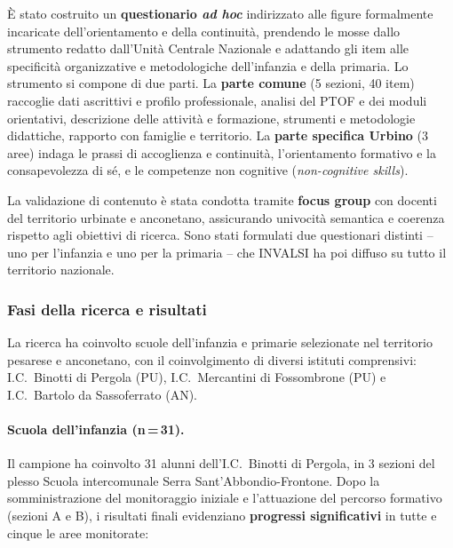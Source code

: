 \documentclass[12pt,a4paper]{article}
\begin{document}
\`E stato costruito un \textbf{questionario \textit{ad hoc}} indirizzato alle figure formalmente incaricate dell'orientamento e della continuit\`a, prendendo le mosse dallo strumento redatto dall'Unit\`a Centrale Nazionale e adattando gli item alle specificit\`a organizzative e metodologiche dell'infanzia e della primaria. Lo strumento si compone di due parti. La \textbf{parte comune} (5 sezioni, 40 item) raccoglie dati ascrittivi e profilo professionale, analisi del PTOF e dei moduli orientativi, descrizione delle attivit\`a e formazione, strumenti e metodologie didattiche, rapporto con famiglie e territorio. La \textbf{parte specifica Urbino} (3 aree) indaga le prassi di accoglienza e continuit\`a, l'orientamento formativo e la consapevolezza di s\'e, e le competenze non cognitive (\textit{non-cognitive skills}).

La validazione di contenuto \`e stata condotta tramite \textbf{focus group} con docenti del territorio urbinate e anconetano, assicurando univocit\`a semantica e coerenza rispetto agli obiettivi di ricerca. Sono stati formulati due questionari distinti -- uno per l'infanzia e uno per la primaria -- che INVALSI ha poi diffuso su tutto il territorio nazionale.

\subsubsection{Fasi della ricerca e risultati}

La ricerca ha coinvolto scuole dell'infanzia e primarie selezionate nel territorio pesarese e anconetano, con il coinvolgimento di diversi istituti comprensivi: I.C.\ Binotti di Pergola (PU), I.C.\ Mercantini di Fossombrone (PU) e I.C.\ Bartolo da Sassoferrato (AN).

\paragraph{Scuola dell'infanzia (n\,=\,31).} Il campione ha coinvolto 31 alunni dell'I.C.\ Binotti di Pergola, in 3 sezioni del plesso Scuola intercomunale Serra Sant'Abbondio-Frontone. Dopo la somministrazione del monitoraggio iniziale e l'attuazione del percorso formativo (sezioni A e B), i risultati finali evidenziano \textbf{progressi significativi} in tutte e cinque le aree monitorate:
\end{document}
